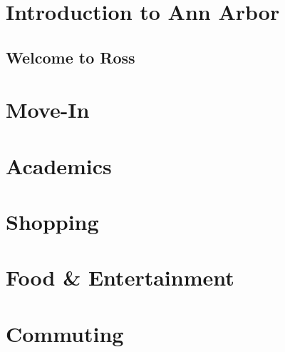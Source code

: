 \documentclass[
]{book}
\begin{document}
\hypertarget{introduction-to-ann-arbor}{%
\chapter{Introduction to Ann Arbor}\label{introduction-to-ann-arbor}}

\hypertarget{welcome-to-ross}{%
\section{Welcome to Ross}\label{welcome-to-ross}}

\hypertarget{move-in}{%
\chapter{Move-In}\label{move-in}}

\hypertarget{academics}{%
\chapter{Academics}\label{academics}}

\hypertarget{shopping}{%
\chapter{Shopping}\label{shopping}}

\hypertarget{food-entertainment}{%
\chapter{Food \& Entertainment}\label{food-entertainment}}

\hypertarget{commuting}{%
\chapter{Commuting}\label{commuting}}

  
\end{document}
